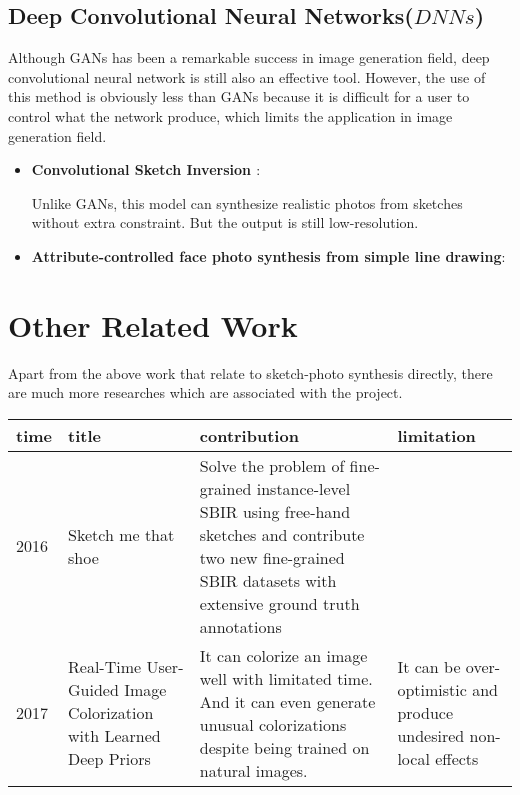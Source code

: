 \documentclass{article}
\begin{document}
\subsection{Deep Convolutional Neural Networks($DNNs$)}
\indent Although GANs has been a remarkable success in image generation field, deep convolutional neural network is still also an effective tool. However, the use of this method is obviously less than GANs because it is difficult for a user to control what the network produce, which limits the application in image generation field.



\begin{itemize}
\item \textbf{Convolutional Sketch Inversion \cite{G2016Convolutional}}: \par
Unlike GANs, this model can synthesize realistic photos from sketches without extra constraint. But the output is still low-resolution.

\item \textbf{Attribute-controlled face photo synthesis from simple line drawing\cite{Guo2017Attribute}}:\par



\end{itemize}


\section{Other Related Work}
\indent Apart from the above work that relate to sketch-photo synthesis directly, there are much more researches which are associated with the project.




\begin{table}[htbp]
\centering
\begin{tabular}{|p{1cm}|p{4.5cm}|p{5.5cm}|p{5.5cm}|}
\hline
time&title&contribution&limitation\\

\hline
2016&Sketch me that shoe\cite{Q_Yu2016Sketch}&Solve the problem of fine-grained instance-level SBIR using free-hand sketches and contribute two new
fine-grained SBIR datasets with extensive ground truth annotations & \\

\hline
2017&Real-Time User-Guided Image Colorization with Learned Deep Priors\cite{Efros2017Real}&It can colorize an image well with limitated time. And it can even generate unusual colorizations despite being trained on natural images.& It can be over-optimistic and produce undesired non-local effects\\

\hline


\end{tabular}
\end{table}
\end{document}
